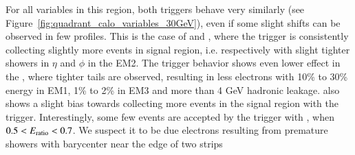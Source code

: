 For all variables in this region, both triggers behave very similarly (see Figure~\ref{fig:quadrant_calo_variables_30GeV}), even if some slight shifts can be observed in few profiles. This is the case of \reta{} and \rphi{}, where the \rnn{} trigger is consistently collecting slightly more events in signal region, i.e. respectively with slight tighter showers in $\eta{}$ and $\phi{}$ in the EM2. The \rnn{} trigger behavior shows even lower effect in the \rhad{}, where tighter tails are observed, resulting in less electrons with 10\% to 30\% energy in EM1, 1\% to 2\% in EM3 and more than 4 GeV hadronic leakage. \eratio{} also shows a slight bias towards collecting more events in the signal region with the \rnn{} trigger. Interestingly, some few events are accepted by the trigger with \rnn{}, when $0.5<E_\text{ratio}{}<0.7$. We suspect it to be due electrons resulting from premature showers with barycenter near the edge of two strips

